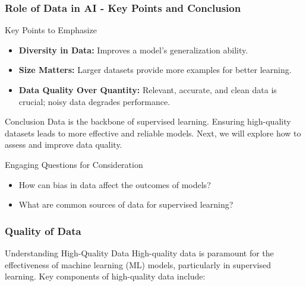 \documentclass[aspectratio=169]{beamer}
\begin{document}
\begin{frame}[fragile]
    \frametitle{Role of Data in AI - Key Points and Conclusion}
    \begin{block}{Key Points to Emphasize}
        \begin{itemize}
            \item \textbf{Diversity in Data:} Improves a model's generalization ability.
            \item \textbf{Size Matters:} Larger datasets provide more examples for better learning.
            \item \textbf{Data Quality Over Quantity:} Relevant, accurate, and clean data is crucial; noisy data degrades performance.
        \end{itemize}
    \end{block}
    
    \begin{block}{Conclusion}
        Data is the backbone of supervised learning. Ensuring high-quality datasets leads to more effective and reliable models. Next, we will explore how to assess and improve data quality.
    \end{block}

    \begin{block}{Engaging Questions for Consideration}
        \begin{itemize}
            \item How can bias in data affect the outcomes of models?
            \item What are common sources of data for supervised learning?
        \end{itemize}
    \end{block}
\end{frame}

\begin{frame}[fragile]
    \frametitle{Quality of Data}
    \begin{block}{Understanding High-Quality Data}
        High-quality data is paramount for the effectiveness of machine learning (ML) models, particularly in supervised learning. Key components of high-quality data include:
    \end{block}
\end{frame}
\end{document}
